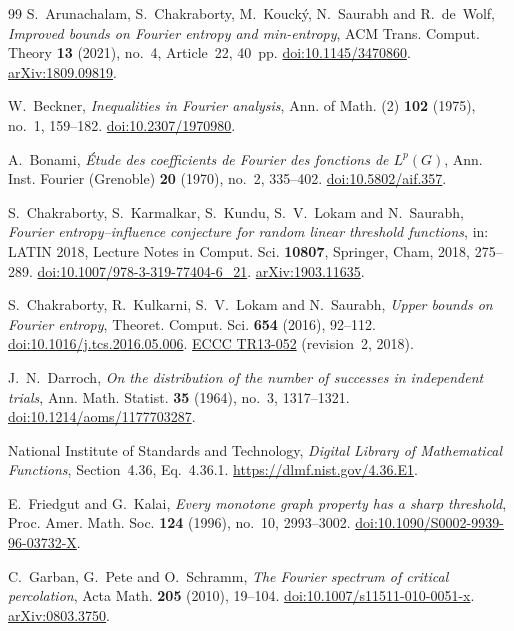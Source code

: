\documentclass[11pt]{amsart}
\theoremstyle{definition}
\theoremstyle{remark}
\begin{document}
\begin{thebibliography}{99}
S.~Arunachalam, S.~Chakraborty, M.~Kouck\'y, N.~Saurabh and R.~de~Wolf,
\emph{Improved bounds on Fourier entropy and min-entropy},
ACM Trans. Comput. Theory \textbf{13} (2021), no.~4, Article~22, 40~pp.
\href{https://doi.org/10.1145/3470860}{doi:10.1145/3470860}.
\href{https://arxiv.org/abs/1809.09819}{arXiv:1809.09819}.

W.~Beckner,
\emph{Inequalities in Fourier analysis},
Ann. of Math. (2) \textbf{102} (1975), no.~1, 159--182.
\href{https://doi.org/10.2307/1970980}{doi:10.2307/1970980}.

A.~Bonami,
\emph{\'Etude des coefficients de Fourier des fonctions de $L^p(G)$},
Ann. Inst. Fourier (Grenoble) \textbf{20} (1970), no.~2, 335--402.
\href{https://doi.org/10.5802/aif.357}{doi:10.5802/aif.357}.

S.~Chakraborty, S.~Karmalkar, S.~Kundu, S.~V.~Lokam and N.~Saurabh,
\emph{Fourier entropy--influence conjecture for random linear threshold functions},
in: LATIN 2018, Lecture Notes in Comput. Sci. \textbf{10807}, Springer, Cham, 2018, 275--289.
\href{https://doi.org/10.1007/978-3-319-77404-6_21}{doi:10.1007/978-3-319-77404-6\_21}.
\href{https://arxiv.org/abs/1903.11635}{arXiv:1903.11635}.

S.~Chakraborty, R.~Kulkarni, S.~V.~Lokam and N.~Saurabh,
\emph{Upper bounds on Fourier entropy},
Theoret. Comput. Sci. \textbf{654} (2016), 92--112.
\href{https://doi.org/10.1016/j.tcs.2016.05.006}{doi:10.1016/j.tcs.2016.05.006}.
\href{https://eccc.weizmann.ac.il/report/2013/052/}{ECCC TR13-052} (revision~2, 2018).

J.~N.~Darroch,
\emph{On the distribution of the number of successes in independent trials},
Ann. Math. Statist. \textbf{35} (1964), no.~3, 1317--1321.
\href{https://doi.org/10.1214/aoms/1177703287}{doi:10.1214/aoms/1177703287}.

National Institute of Standards and Technology,
\emph{Digital Library of Mathematical Functions},
Section~4.36, Eq.~4.36.1.
\url{https://dlmf.nist.gov/4.36.E1}.

E.~Friedgut and G.~Kalai,
\emph{Every monotone graph property has a sharp threshold},
Proc. Amer. Math. Soc. \textbf{124} (1996), no.~10, 2993--3002.
\href{https://doi.org/10.1090/S0002-9939-96-03732-X}{doi:10.1090/S0002-9939-96-03732-X}.

C.~Garban, G.~Pete and O.~Schramm,
\emph{The Fourier spectrum of critical percolation},
Acta Math. \textbf{205} (2010), 19--104.
\href{https://doi.org/10.1007/s11511-010-0051-x}{doi:10.1007/s11511-010-0051-x}.
\href{https://arxiv.org/abs/0803.3750}{arXiv:0803.3750}.


\end{thebibliography}
\end{document}
